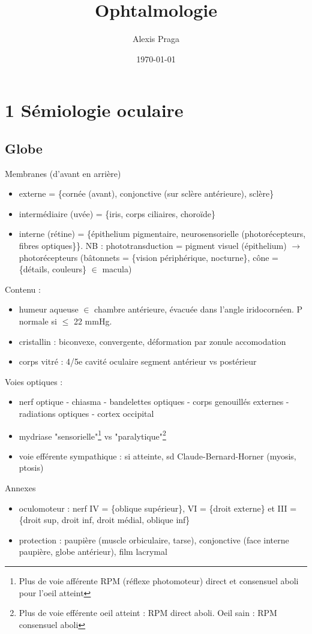 \documentclass[11pt]{article}
\author{Alexis Praga}
\date{\today}
\title{Ophtalmologie}
\begin{document}
\maketitle
\tableofcontents


\section{1 Sémiologie oculaire}
\label{sec:org35e1b30}
\subsection{Globe}
\label{sec:org2819582}
Membranes (d'avant en arrière)
\begin{itemize}
\item externe = \{cornée (avant), conjonctive (sur sclère antérieure), sclère\}
\item intermédiaire (uvée) = \{iris, corps ciliaires, choroïde\}
\item interne (rétine) = \{épithelium pigmentaire, neurosensorielle (photorécepteurs,
fibres optiques\}\}. NB : phototransduction = pigment visuel
(épithelium) \(\rightarrow\) photorécepteurs (bâtonnets = \{vision périphérique,
nocturne\}, cône = \{détails, couleurs\} \(\in\) macula)
\end{itemize}
Contenu : 
\begin{itemize}
\item humeur aqueuse \(\in\) chambre antérieure, évacuée dans l'angle iridocornéen. P
normale si \(\le\) 22 mmHg.
\item cristallin : biconvexe, convergente, déformation par zonule \thus accomodation
\item corps vitré : 4/5e cavité oculaire \thus segment antérieur vs postérieur
\end{itemize}
Voies optiques : 
\begin{itemize}
\item nerf optique - chiasma - bandelettes optiques - corps genouillés externes - radiations optiques - cortex occipital
\item mydriase "sensorielle"\footnote{Plus de voie afférente  \thus RPM (réflexe photomoteur) direct et
consensuel aboli pour l'oeil atteint} vs "paralytique"\footnote{Plus de voie efférente \thus oeil atteint : RPM direct aboli. Oeil sain : RPM consensuel aboli}
\item voie efférente sympathique : si atteinte, sd Claude-Bernard-Horner (myosis, ptosis)
\end{itemize}
Annexes
\begin{itemize}
\item oculomoteur : nerf IV = \{oblique supérieur\}, VI = \{droit externe\} et III =
\{droit sup, droit inf, droit médial, oblique inf\}
\item protection : paupière (muscle orbiculaire, tarse), conjonctive (face interne
paupière, globe antérieur), film lacrymal
\end{itemize}
\end{document}
